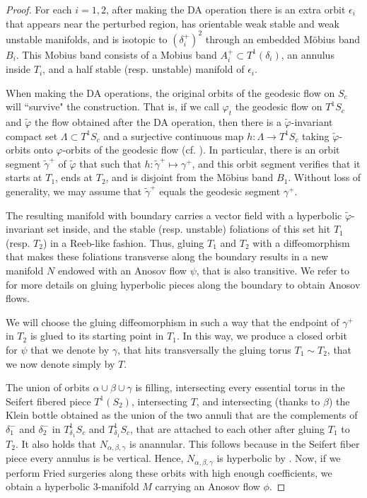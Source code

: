 \documentclass[12pt]{amsart}
\theoremstyle{definition}
\theoremstyle{remark}
\begin{document}
\begin{proof}
For each $i=1,2$, after making the DA operation there is an extra orbit $\epsilon_i$ that appears near the perturbed region, has orientable weak stable and weak unstable manifolds, and is isotopic to $(\delta_i^{+})^2$ through an embedded M\"obius band $B_i$. This Mobius band consists of a Mobius band $A_i^{+}\subset T^1(\delta_i)$, an annulus inside $T_i$, and a half stable (resp. unstable) manifold of $\epsilon_i$.

When making the DA operations, the original orbits of the geodesic flow on $S_c$ will ``survive" the construction. That is, if we call $\varphi_t$ the geodesic flow on $T^1 S_c$ and $\tilde \varphi$ the flow obtained after the DA operation, then there is a $\tilde\varphi$-invariant compact set $\Lambda\subset T^1 S_c$ and a surjective continuous map $h:\Lambda\to T^1 S_c$ taking $\tilde\varphi$-orbits onto $\varphi$-orbits of the geodesic flow (cf. \cite{beguin2017building}). In particular, there is an orbit segment $\tilde\gamma^{+}$ of $\tilde\varphi$ that such that $h:\tilde\gamma^{+}\mapsto\gamma^{+}$, and this orbit segment verifies that it starts at $T_1$, ends at $T_2$, and is disjoint from the M\"obius band $B_1$. Without loss of generality, we may assume that $\tilde\gamma^{+}$ equals the geodesic segment $\gamma^{+}$. 

The resulting manifold with boundary carries a vector field with a hyperbolic $\tilde\varphi$-invariant set inside, and the stable (resp. unstable) foliations of this set hit $T_1$ (resp. $T_2$) in a Reeb-like fashion. Thus, gluing $T_1$ and $T_2$ with a diffeomorphism that makes these foliations transverse along the boundary results in a new manifold $N$ endowed with an Anosov flow $\psi$, that is also transitive. We refer to \cite{beguin2017building} for more details on gluing hyperbolic pieces along the boundary to obtain Anosov flows.

We will choose the gluing diffeomorphism in such a way that the endpoint of $\gamma^{+}$ in $T_2$ is glued to its starting point in $T_1$. In this way, we produce a closed orbit for $\psi$ that we denote by $\gamma$, that hits transversally the gluing torus $T_1\sim T_2$, that we now denote simply by $T$.

The union of orbits $\alpha\cup\beta\cup\gamma$ is filling, intersecting every essential torus in the Seifert fibered piece $T^1(S_2)$, intersecting $T$, and intersecting (thanks to $\beta$) the Klein bottle obtained as the union of the two annuli that are the complements of $\delta_1^{-}$ and $\delta_2^{-}$ in $T^1_{\delta_1} S_c$ and $T^1_{\delta_1} S_c$, that are attached to each other after gluing $T_1$ to $T_2$. It also holds that $N_{\alpha,\beta,\gamma}$ is anannular. This follows because in the Seifert fiber piece every annulus is be vertical. Hence, $N_{\alpha,\beta,\gamma}$ is hyperbolic by .
Now, if we perform Fried surgeries along these orbits with high enough coefficients, we obtain a hyperbolic 3-manifold $M$ carrying an Anosov flow $\phi$.


\end{proof}
\end{document}
